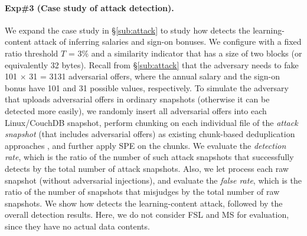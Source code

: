 \paragraph{Exp\#3 (Case study of attack detection).}
We expand the case study in \S\ref{sub:attack} to study how \sysnameF detects the learning-content attack of inferring salaries and sign-on bonuses.
We configure \sysnameF with a fixed ratio threshold $T$ = 3\% and a similarity indicator that has a size of two blocks (or equivalently 32 bytes).
Recall from \S\ref{sub:attack} that the adversary needs to fake 101 $\times$ 31 = 3131 adversarial offers, where the annual salary and the sign-on bonus have 101 and 31 possible values, respectively. To simulate the adversary that uploads adversarial offers in ordinary snapshots (otherwise it can be  detected more easily), we randomly insert all adversarial offers into each Linux/CouchDB snapshot, perform chunking on each individual file of the {\em attack snapshot} (that includes adversarial offers) as existing chunk-based deduplication approaches \cite{fsl, meyer11}, and further apply SPE on the chunks. We evaluate the {\em detection rate}, which is the ratio of the number of such attack snapshots that \sysnameF successfully detects by the total number of attack snapshots. Also, we let \sysnameF process each raw snapshot (without adversarial injections), and evaluate the {\em false rate}, which is the ratio of the number of snapshots that \sysnameF misjudges by the total number of raw snapshots. We show how \sysnameF detects the learning-content attack, followed by the overall detection results.
Here, we do not consider FSL and MS for evaluation, since they have no actual data contents.

